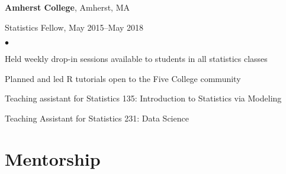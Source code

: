 \documentclass[margin,centered]{res}
\newenvironment{list1}{
  \begin{list}{\ding{113}}{%
      \setlength{\itemsep}{0in}
      \setlength{\parsep}{0in} \setlength{\parskip}{0in}
      \setlength{\topsep}{0in} \setlength{\partopsep}{0in}
      \setlength{\leftmargin}{0.17in}}}{\end{list}}
\newenvironment{list2}{
  \begin{list}{$\bullet$}{%
      \setlength{\itemsep}{0in}
      \setlength{\parsep}{0in} \setlength{\parskip}{0in}
      \setlength{\topsep}{0in} \setlength{\partopsep}{0in}
      \setlength{\leftmargin}{0.2in}}}{\end{list}}
\begin{document}
\begin{resume}
{\bf Amherst College}, Amherst, MA
\begin{list1}
\item[] Statistics Fellow, May 2015--May 2018
\begin{list2}
\vspace*{.05in}
\item Held weekly drop-in sessions available to students in all statistics classes
\item Planned and led R tutorials open to the Five College community
\item Teaching assistant for Statistics 135: Introduction to Statistics via Modeling
\item Teaching Assistant for Statistics 231: Data Science
\end{list2}
\end{list1}


\section{\sc Mentorship}


\end{resume}
\end{document}
